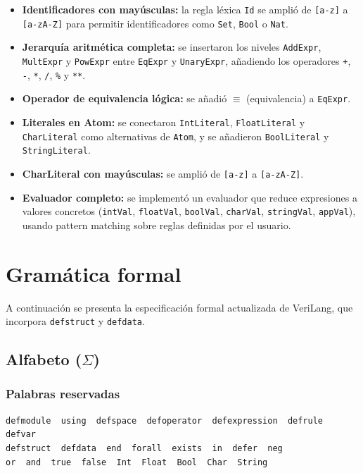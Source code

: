 \documentclass[12pt]{article}
\newcommand{\code}[1]{\texttt{#1}}
\begin{document}
\begin{itemize}
  \item \textbf{Identificadores con mayúsculas:} la regla léxica \code{Id} se amplió de
        \code{[a-z]} a \code{[a-zA-Z]} para permitir identificadores como \code{Set},
        \code{Bool} o \code{Nat}.
  \item \textbf{Jerarquía aritmética completa:} se insertaron los niveles
        \code{AddExpr}, \code{MultExpr} y \code{PowExpr} entre \code{EqExpr} y
        \code{UnaryExpr}, añadiendo los operadores \code{+}, \code{-}, \code{*},
        \code{/}, \code{\%} y \code{**}.
  \item \textbf{Operador de equivalencia lógica:} se añadió \code{$\equiv$} (equivalencia) a
        \code{EqExpr}.
  \item \textbf{Literales en Atom:} se conectaron \code{IntLiteral}, \code{FloatLiteral}
        y \code{CharLiteral} como alternativas de \code{Atom}, y se añadieron
        \code{BoolLiteral} y \code{StringLiteral}.
  \item \textbf{CharLiteral con mayúsculas:} se amplió de \code{[a-z]} a \code{[a-zA-Z]}.
  \item \textbf{Evaluador completo:} se implementó un evaluador que reduce expresiones
        a valores concretos (\code{intVal}, \code{floatVal}, \code{boolVal},
        \code{charVal}, \code{stringVal}, \code{appVal}), usando pattern matching
        sobre reglas definidas por el usuario.
\end{itemize}

\section{Gramática formal}

A continuación se presenta la especificación formal actualizada de VeriLang, que incorpora
\code{defstruct} y \code{defdata}.

\subsection{Alfabeto ($\Sigma$)}

\subsubsection{Palabras reservadas}

\begin{lstlisting}[style=rascalstyle, basicstyle=\ttfamily\small]
defmodule  using  defspace  defoperator  defexpression  defrule  defvar
defstruct  defdata  end  forall  exists  in  defer  neg
or  and  true  false  Int  Float  Bool  Char  String
\end{lstlisting}
\end{document}
